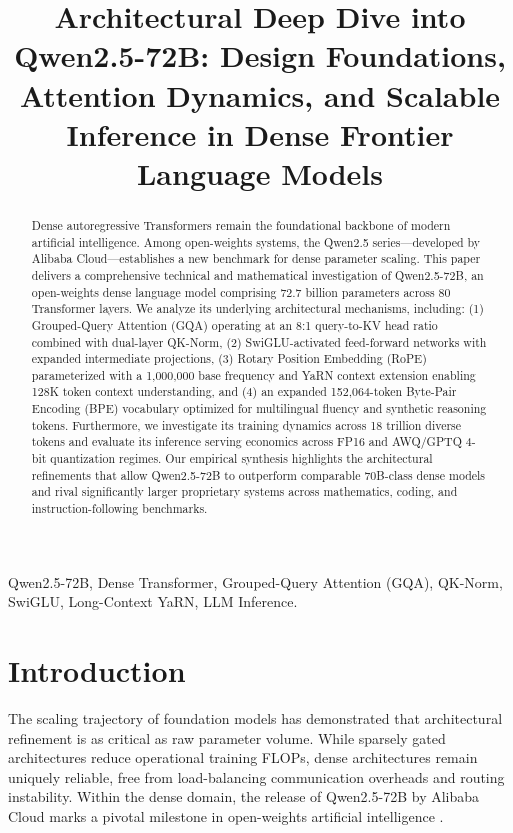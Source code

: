 \documentclass[conference]{IEEEtran}
\begin{document}
\title{Architectural Deep Dive into Qwen2.5-72B: Design Foundations, Attention Dynamics, and Scalable Inference in Dense Frontier Language Models}

\maketitle

\begin{abstract}
Dense autoregressive Transformers remain the foundational backbone of modern artificial intelligence. Among open-weights systems, the Qwen2.5 series—developed by Alibaba Cloud—establishes a new benchmark for dense parameter scaling. This paper delivers a comprehensive technical and mathematical investigation of Qwen2.5-72B, an open-weights dense language model comprising 72.7 billion parameters across 80 Transformer layers. We analyze its underlying architectural mechanisms, including: (1) Grouped-Query Attention (GQA) operating at an 8:1 query-to-KV head ratio combined with dual-layer QK-Norm, (2) SwiGLU-activated feed-forward networks with expanded intermediate projections, (3) Rotary Position Embedding (RoPE) parameterized with a 1,000,000 base frequency and YaRN context extension enabling 128K token context understanding, and (4) an expanded 152,064-token Byte-Pair Encoding (BPE) vocabulary optimized for multilingual fluency and synthetic reasoning tokens. Furthermore, we investigate its training dynamics across 18 trillion diverse tokens and evaluate its inference serving economics across FP16 and AWQ/GPTQ 4-bit quantization regimes. Our empirical synthesis highlights the architectural refinements that allow Qwen2.5-72B to outperform comparable 70B-class dense models and rival significantly larger proprietary systems across mathematics, coding, and instruction-following benchmarks.
\end{abstract}

\begin{IEEEkeywords}
Qwen2.5-72B, Dense Transformer, Grouped-Query Attention (GQA), QK-Norm, SwiGLU, Long-Context YaRN, LLM Inference.
\end{IEEEkeywords}

\section{Introduction}
The scaling trajectory of foundation models has demonstrated that architectural refinement is as critical as raw parameter volume. While sparsely gated architectures reduce operational training FLOPs, dense architectures remain uniquely reliable, free from load-balancing communication overheads and routing instability. Within the dense domain, the release of Qwen2.5-72B by Alibaba Cloud marks a pivotal milestone in open-weights artificial intelligence \cite{qwen2024qwen25, qwen2024qwen2}.
\end{document}
